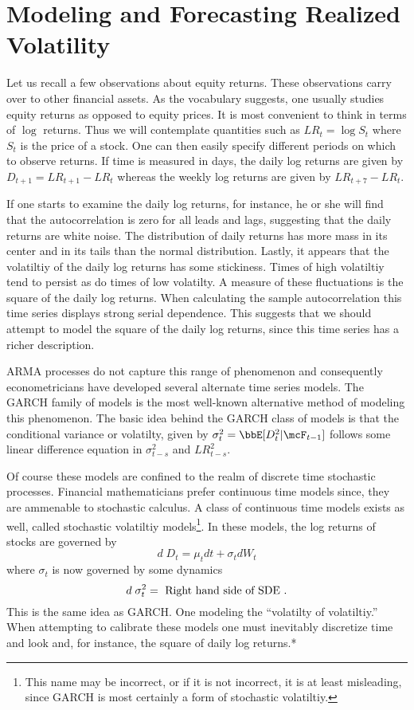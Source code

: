 \documentclass{report}
\begin{document}
\chapter{Modeling and Forecasting Realized Volatility}

Let us recall a few observations about equity returns.  These
observations carry over to other financial assets.  As the vocabulary
suggests, one usually studies equity returns as opposed to equity
prices.  It is most convenient to think in terms of $\log$ returns. 
Thus we will contemplate quantities such as $LR_t = \log S_t$ where
$S_t$ is the price of a stock.  One can then easily specify different
periods on which to observe returns.  If time is measured in days, the
daily log returns are given by $D_{t+1} = LR_{t+1}-LR_{t}$ whereas the
weekly log returns are given by $LR_{t+7}-LR_{t}$.

If one starts to examine the daily log returns, for instance, he or
she will find that the autocorrelation is zero for all leads and lags,
suggesting that the daily returns are white noise.  The distribution
of daily returns has more mass in its center and in its tails than the
normal distribution.  Lastly, it appears that the volatiltiy of the
daily log returns has some stickiness.  Times of high volatiltiy tend
to persist as do times of low volatilty.  A measure of these
fluctuations is the square of the daily log returns.  When calculating
the sample autocorrelation this time series displays strong serial
dependence.  This suggests that we should attempt to model the square
of the daily log returns, since this time series has a richer
description.

ARMA processes do not capture this range of phenomenon and
consequently econometricians have developed several alternate time
series models.  The GARCH family of models is the most well-known
alternative method of modeling this phenomenon.  The basic idea behind
the GARCH class of models is that the conditional variance or
volatilty, given by $\sigma_t^2 = \bbE[D_t^2 | \mcF_{t-1}]$ follows
some linear difference equation in $\sigma_{t-s}^2$ and $LR_{t-s}^2$.

Of course these models are confined to the realm of discrete time
stochastic processes.  Financial mathematicians prefer continuous time
models since, they are ammenable to stochastic calculus.  A class of
continuous time models exists as well, called stochastic volatiltiy
models\footnote{This name may be incorrect, or if it is not incorrect,
it is at least misleading, since GARCH is most certainly a form of
stochastic volatiltiy.}.  In these models, the log returns of stocks
are governed by
\[
d \; D_t = \mu_t dt + \sigma_t dW_t
\]
where $\sigma_t$ is now governed by some dynamics
\[
d \; \sigma_t^2 = \textmd{ Right hand side of SDE }.
\]
This is the same idea as GARCH.  One modeling the ``volatilty of
volatiltiy.''  When attempting to calibrate these models one must
inevitably discretize time and look and, for instance, the square of
daily log returns.*
\end{document}
